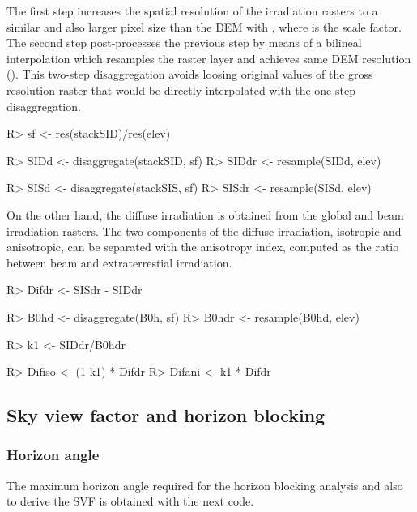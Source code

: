 \documentclass[article]{jss}
\begin{document}
The first step increases the spatial resolution of the irradiation
rasters to a similar and also larger pixel size than the DEM with
, where  is the scale factor. The
second step post-processes the previous step by means of a
bilineal interpolation which resamples the raster layer and
achieves same DEM resolution (). This two-step
disaggregation avoids loosing original values of the gross
resolution raster that would be directly interpolated with the
one-step disaggregation.

\begin{CodeChunk}
\begin{CodeInput}
R> sf <- res(stackSID)/res(elev)

R> SIDd <- disaggregate(stackSID, sf)
R> SIDdr <- resample(SIDd, elev)

R> SISd <- disaggregate(stackSIS, sf)
R> SISdr <- resample(SISd, elev)
\end{CodeInput}
\end{CodeChunk}

On the other hand, the diffuse irradiation is obtained from the global
and beam irradiation rasters. The two components of the diffuse
irradiation, isotropic and anisotropic, can be separated with the
anisotropy index, computed as the ratio between beam and
extraterrestial irradiation.

\begin{CodeChunk}
\begin{CodeInput}
R> Difdr <- SISdr - SIDdr

R> B0hd <- disaggregate(B0h, sf)
R> B0hdr <- resample(B0hd, elev)

R> k1 <- SIDdr/B0hdr

R> Difiso <- (1-k1) * Difdr
R> Difani <- k1 * Difdr
\end{CodeInput}
\end{CodeChunk}


\subsection{Sky view factor and horizon blocking}
\label{sec-1-5}

\subsubsection{Horizon angle}
\label{sec-1-5-1}

The maximum horizon angle required for the horizon blocking analysis
and also to derive the SVF is obtained with the next code. 
\end{document}
